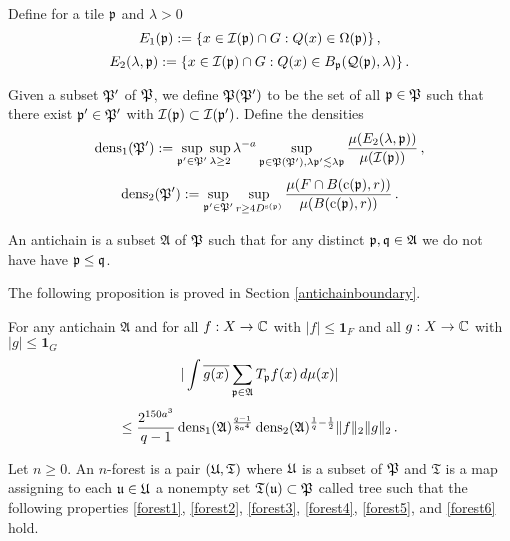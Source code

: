 Define for a tile $\mathfrak p$ and $\lambda>0$
\begin{equation}\label{definee1}
    E_1(\mathfrak p):=\{x\in \mathcal{I}(\mathfrak p)\cap G: {Q}(x)\in \Omega(\mathfrak p)\}\, ,
\end{equation}
\begin{equation}\label{definee2}
    E_2(\lambda, \mathfrak p):=\{x\in \mathcal{I}(\mathfrak p)\cap G: {Q}(x)\in B_{\mathfrak p}(\mathcal{Q}(\mathfrak p), \lambda)\}\, .
\end{equation}



Given a subset $\mathfrak P'$ of $\mathfrak P$, we define
$\mathfrak P(\mathfrak P')$ to be the set of
all $\mathfrak p \in \mathfrak P$ such that there exist $\mathfrak p' \in \mathfrak P'$ with $\mathcal{I}(\mathfrak p)\subset \mathcal{I}(\mathfrak p')$. Define  the densities
\begin{equation}\label{definedens1}
    {\operatorname{\operatorname{dens}}}_1(\mathfrak P') := \sup_{\mathfrak p'\in \mathfrak P'}\sup_{\lambda \geq 2} \lambda^{-a} \sup_{\mathfrak p \in \mathfrak P(\mathfrak P'), \lambda \mathfrak p' \lesssim \lambda \mathfrak p}
    \frac{\mu({E}_2(\lambda, \mathfrak p))}{\mu(\mathcal{I}(\mathfrak p))}\, ,
\end{equation}
\begin{equation}\label{definedens2}
    {\operatorname{\operatorname{dens}}}_2(\mathfrak P') := \sup_{\mathfrak p'\in \mathfrak P'}
    \sup_{r\ge 4D^{\mathrm{s}(\mathfrak p)}}
    \frac{\mu(F\cap B(\mathrm{c}(\mathfrak p),r))}{\mu(B(\mathrm{c}(\mathfrak p),r))}\, .
\end{equation}





An antichain is a subset $\mathfrak{A}$
of $\mathfrak P$ such that for any distinct $\mathfrak p,\mathfrak q\in \mathfrak{A}$ we do not have have $\mathfrak p\le \mathfrak q$.

The following proposition is proved in Section \ref{antichainboundary}.

\begin{prop}\label{antichain operator}
For any antichain $\mathfrak{A} $ and  for all $f:X\to \mathbb{C}$ with $|f|\le \mathbf{1}_F$ and all $g:X\to\mathbb{C}$ with $|g| \le \mathbf{1}_G$
\begin{equation} \label{eq antiprop}
    |\int  \overline{g(x)} \sum_{\mathfrak p \in \mathfrak{A}} T_{\mathfrak p} f(x)\, d\mu(x)|
\end{equation}
\begin{equation}
    \le  \frac{2^{150a^3}}{q-1} \operatorname{\operatorname{dens}}_1(\mathfrak{A})^{\frac {q-1}{8a^4}}\operatorname{\operatorname{dens}}_2(\mathfrak{A})^{\frac 1{q}-\frac 12}  \|f\|_2 \|g\|_2\, .
\end{equation}
\end{prop}

Let $n\ge 0$.
An $n$-forest is a pair $(\mathfrak U, \mathfrak{T})$
where  $\mathfrak U$ is a subset of $\mathfrak P$
and $\mathfrak{T}$ is a map assigning to
each $\mathfrak u\in \mathfrak U$ a nonempty set $\mathfrak T (\mathfrak u)\subset \mathfrak P$ called tree
such that the following properties
\eqref{forest1}, \eqref{forest2},
\eqref{forest3},
\eqref{forest4},
\eqref{forest5}, and
\eqref{forest6}
hold.

